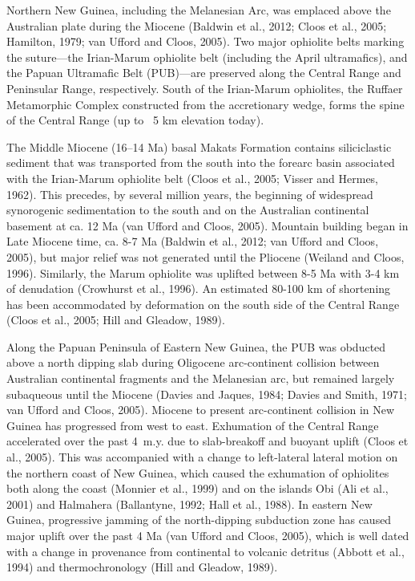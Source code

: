 \documentclass[11pt,letterpaper]{article}
\begin{document}
Northern New Guinea, including the Melanesian Arc, was emplaced above the Australian plate during the Miocene (Baldwin et al., 2012; Cloos et al., 2005; Hamilton, 1979; van Ufford and Cloos, 2005). Two major ophiolite belts marking the suture—the Irian-Marum ophiolite belt (including the April ultramafics), and the Papuan Ultramafic Belt (PUB)—are preserved along the Central Range and Peninsular Range, respectively. South of the Irian-Marum ophiolites, the Ruffaer Metamorphic Complex constructed from the accretionary wedge, forms the spine of the Central Range (up to ~5 km elevation today).

The Middle Miocene (16–14 Ma) basal Makats Formation contains siliciclastic sediment that was transported from the south into the forearc basin associated with the Irian-Marum ophiolite belt (Cloos et al., 2005; Visser and Hermes, 1962). This precedes, by several million years, the beginning of widespread synorogenic sedimentation to the south and on the Australian continental basement at ca. 12 Ma (van Ufford and Cloos, 2005). Mountain building began in Late Miocene time, ca. 8-7 Ma (Baldwin et al., 2012; van Ufford and Cloos, 2005), but major relief was not generated until the Pliocene (Weiland and Cloos, 1996). Similarly, the Marum ophiolite was uplifted between 8-5 Ma with 3-4 km of denudation (Crowhurst et al., 1996). An estimated 80-100 km of shortening has been accommodated by deformation on the south side of the Central Range (Cloos et al., 2005; Hill and Gleadow, 1989).

Along the Papuan Peninsula of Eastern New Guinea, the PUB was obducted above a north dipping slab during Oligocene arc-continent collision between Australian continental fragments and the Melanesian arc, but remained largely subaqueous until the Miocene (Davies and Jaques, 1984; Davies and Smith, 1971; van Ufford and Cloos, 2005). Miocene to present arc-continent collision in New Guinea has progressed from west to east. Exhumation of the Central Range accelerated over the past 4~m.y. due to slab-breakoff and buoyant uplift (Cloos et al., 2005). This was accompanied with a change to left-lateral lateral motion on the northern coast of New Guinea, which caused the exhumation of ophiolites both along the coast (Monnier et al., 1999) and on the islands Obi (Ali et al., 2001) and Halmahera (Ballantyne, 1992; Hall et al., 1988). In eastern New Guinea, progressive jamming of the north-dipping subduction zone has caused major uplift over the past 4 Ma (van Ufford and Cloos, 2005), which is well dated with a change in provenance from continental to volcanic detritus (Abbott et al., 1994) and thermochronology (Hill and Gleadow, 1989).
\end{document}
